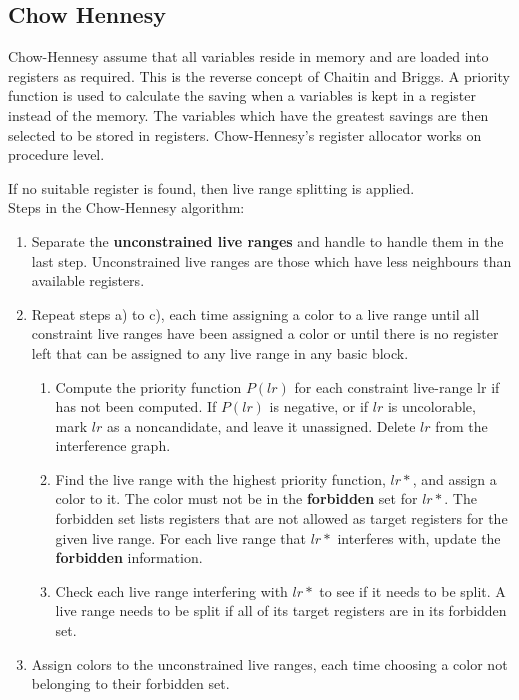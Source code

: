 \documentclass[a4paper,10pt]{article}
\begin{document}
\subsection{Chow Hennesy}
Chow-Hennesy assume that all variables reside in memory and are loaded into registers as required. This is the reverse concept of
Chaitin and Briggs. A priority function is used to calculate the saving when a variables is kept in a register 
instead of the memory. The variables which have the greatest savings are then selected to be stored in registers. Chow-Hennesy's
register allocator works on procedure level.

If no suitable register is found, then live range splitting is applied.\\

Steps in the Chow-Hennesy algorithm:
\begin{enumerate}
 \item Separate the \textbf{unconstrained live ranges} and handle to handle them in the last step. Unconstrained live ranges are those 
       which have less neighbours than available registers.
 \item Repeat steps a) to c), each time assigning a color to a live range until all constraint live ranges have been assigned a color or
       until there is no register left that can be assigned to any live range in any basic block.
 \begin{enumerate}
  \item Compute the priority function $P(lr)$ for each constraint live-range lr if has not been computed. If $P(lr)$ is negative, or if 
        $lr$ is uncolorable, mark $lr$ as a noncandidate, and leave it unassigned. Delete $lr$ from the interference graph.
  \item Find the live range with the highest priority function, $lr*$, and assign a color to it. The color must not be in the
        \textbf{forbidden} set for $lr*$. The forbidden set lists registers that are not allowed as target registers for the given live 
        range. For each live range that $lr*$ interferes with, update the \textbf{forbidden} information.
  \item Check each live range interfering with $lr*$ to see if it needs to be split. A live range needs to be split if all of its target 
        registers are in its forbidden set.
 \end{enumerate}
 \item Assign colors to the unconstrained live ranges, each time choosing a color not belonging to their forbidden set.
\end{enumerate}
\end{document}
